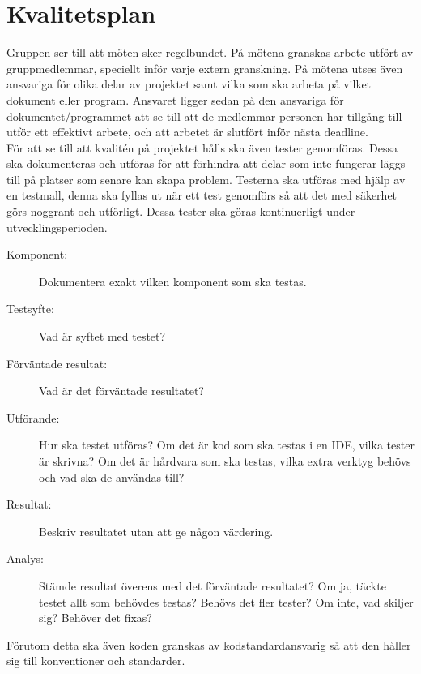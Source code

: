 \documentclass[a4paper]{article}
\begin{document}
\newpage
\section{Kvalitetsplan}
Gruppen ser till att möten sker regelbundet. På mötena granskas arbete utfört av gruppmedlemmar, speciellt inför varje extern granskning. På mötena utses även ansvariga för olika delar av projektet samt vilka som ska arbeta på vilket dokument eller program. Ansvaret ligger sedan på den ansvariga för dokumentet/programmet att se till att de medlemmar personen har tillgång till utför ett effektivt arbete, och att arbetet är slutfört inför nästa deadline. \\

För att se till att kvalitén på projektet hålls ska även tester genomföras. Dessa ska dokumenteras och utföras för att förhindra att delar som inte fungerar läggs till på platser som senare kan skapa problem. Testerna ska utföras med hjälp av en testmall, denna ska fyllas ut när ett test genomförs så att det med säkerhet görs noggrant och utförligt. Dessa tester ska göras kontinuerligt under utvecklingsperioden.
\begin{description}
\item[Komponent:] 
Dokumentera exakt vilken komponent som ska testas.

\item[Testsyfte:] Vad är syftet med testet?

\item[Förväntade resultat:] Vad är det förväntade resultatet?

\item[Utförande:] Hur ska testet utföras? Om det är kod som ska testas i en IDE, vilka tester är skrivna? Om det är hårdvara som ska testas, vilka extra verktyg behövs och vad ska de användas till?

\item[Resultat:] Beskriv resultatet utan att ge någon värdering.

\item[Analys:] Stämde resultat överens med det förväntade resultatet? Om ja, täckte testet allt som behövdes testas? Behövs det fler tester? Om inte, vad skiljer sig? Behöver det fixas?
\end{description}
Förutom detta ska även koden granskas av kodstandardansvarig så att den håller sig till konventioner och standarder.
\end{document}
